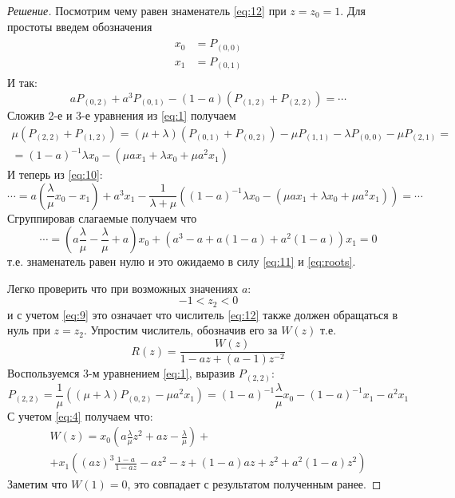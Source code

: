 \documentclass[12pt,a4paper]{article}
\begin{document}
\begin{proof}[Решение]
	Посмотрим чему равен знаменатель \eqref{eq:12} при $z = z_0 = 1$. Для простоты введем обозначения
	\begin{align}\label{eq:x}
	\begin{split}
	x_0 &= P_{(0, 0)} \\
	x_1 &= P_{(0, 1)}
	\end{split}
	\end{align}
	И так:
	\begin{equation}\label{eq:10}
		aP_{(0, 2)} + a^3 P_{(0, 1)} - (1 - a)(P_{(1, 2)} + P_{(2, 2)}) = \cdots
	\end{equation}
	Сложив 2-е и 3-е уравнения из \eqref{eq:1} получаем
	\begin{multline*}
		\mu \left(P_{(2, 2)} + P_{(1, 2)}\right) =  (\mu + \lambda)\left(P_{(0, 1)} + P_{(0, 2)}\right) - \mu P_{(1, 1)} - \lambda P_{(0, 0)} - \mu P_{(2, 1)} = \\ = (1 - a)^{-1} \lambda x_0 - \left(\mu a x_1 + \lambda x_0 + \mu a^2 x_1\right)
	\end{multline*}
	И теперь из \eqref{eq:10}:
	\begin{equation*}
		\cdots = a \left(\frac{\lambda}{\mu} x_0 - x_1\right) + a^3 x_1 - \frac{1}{\lambda + \mu} \left((1 - a)^{-1} \lambda x_0 - \left(\mu a x_1 + \lambda x_0 + \mu a^2 x_1\right)\right) = \cdots
	\end{equation*}
	Сгруппировав слагаемые получаем что
	\begin{equation*}
		\cdots = \left(a \frac{\lambda}{\mu} - \frac{\lambda}{\mu} + a\right) x_0 + \left(a^3 - a + a(1 - a) + a^2 (1 - a)\right) x_1 = 0
	\end{equation*} 
	т.е. знаменатель равен нулю и это ожидаемо в силу \eqref{eq:11} и \eqref{eq:roots}. 
	
	Легко проверить что при возможных значениях $a$:
	\begin{equation*}
		-1 < z_2 < 0
	\end{equation*}
	и с учетом \eqref{eq:9} это означает что числитель \eqref{eq:12} также должен обращаться в нуль при $z = z_2$. Упростим числитель, обозначив его за $W(z)$ т.е.
	\begin{equation*}
		R(z) = \frac{W(z)}{1 - az + (a-1)z^{-2}}
	\end{equation*} 
	Воспользуемся 3-м уравнением \eqref{eq:1}, выразив $P_{(2, 2)}$:
	\begin{equation*}
		P_{(2, 2)} = \frac{1}{\mu}\left((\mu + \lambda) P_{(0, 2)} - \mu a^2 x_1\right) = (1 - a)^{-1} \frac{\lambda}{\mu} x_0 - (1 - a)^{-1} x_1  - a^2 x_1
	\end{equation*}
	С учетом \eqref{eq:4} получаем что:
	\begin{multline*}
		W(z) = x_0 \left(a \frac{\lambda}{\mu} z^2 + a z - \frac{\lambda}{\mu}\right) + \\ + x_1 \left((az)^3 \frac{1-a}{1-az} - az^2 - z + (1-a)az + z^2 + a^2 (1 - a)z^2\right)
	\end{multline*}
	Заметим что $W(1) = 0$, это совпадает с результатом полученным ранее. 
	

\end{proof}
\end{document}
